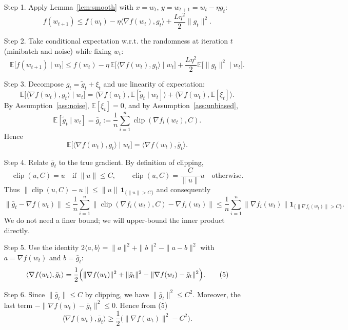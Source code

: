 \documentclass{article}
\newcommand{\E}{\mathbb{E}}
\begin{document}
\begin{enumerate}
\item[Step 1.] Apply Lemma~\ref{lem:smooth} with $x=w_t$, $y=w_{t+1}=w_t-\eta g_t$:
\[
f(w_{t+1})\le f(w_t)-\eta\langle\nabla f(w_t),g_t\rangle+\frac{L\eta^{2}}{2}\|g_t\|^{2}.
\tag{2}
\]

\item[Step 2.] Take conditional expectation w.r.t. the randomness at iteration $t$ (minibatch and noise) while fixing $w_t$:
\[
\E\!\bigl[f(w_{t+1})\mid w_t\bigr]\le f(w_t)-\eta\,\E\!\bigl[\langle\nabla f(w_t),g_t\rangle\mid w_t\bigr]
+\frac{L\eta^{2}}{2}\E\!\bigl[\|g_t\|^{2}\mid w_t\bigr].
\tag{3}
\]

\item[Step 3.] Decompose $g_t=\tilde g_t+\xi_t$ and use linearity of expectation:
\[
\E\!\bigl[\langle\nabla f(w_t),g_t\rangle\mid w_t\bigr]
=\langle\nabla f(w_t),\E[\tilde g_t\mid w_t]\rangle
+\langle\nabla f(w_t),\E[\xi_t]\rangle.
\]
By Assumption~\ref{ass:noise}, $\E[\xi_t]=0$, and by Assumption~\ref{ass:unbiased},
\[
\E[\tilde g_t\mid w_t]=\bar g_t:=\frac{1}{n}\sum_{i=1}^{n}\operatorname{clip}(\nabla f_i(w_t),C).
\]
Hence
\[
\E\!\bigl[\langle\nabla f(w_t),g_t\rangle\mid w_t\bigr]
=\langle\nabla f(w_t),\bar g_t\rangle.
\tag{4}
\]

\item[Step 4.] Relate $\bar g_t$ to the true gradient. By definition of clipping,
\[
\operatorname{clip}(u,C)=u\quad\text{if }\|u\|\le C,\qquad
\operatorname{clip}(u,C)=\frac{C}{\|u\|}u\quad\text{otherwise}.
\]
Thus $\|\operatorname{clip}(u,C)-u\|\le \|u\|\,\mathbf 1_{\{\|u\|>C\}}$ and consequently
\[
\bigl\|\bar g_t-\nabla f(w_t)\bigr\|
\le\frac{1}{n}\sum_{i=1}^{n}\bigl\|\operatorname{clip}(\nabla f_i(w_t),C)-\nabla f_i(w_t)\bigr\|
\le\frac{1}{n}\sum_{i=1}^{n}\|\nabla f_i(w_t)\|\mathbf 1_{\{\|\nabla f_i(w_t)\|>C\}}.
\]
We do not need a finer bound; we will upper‑bound the inner product directly.

\item[Step 5.] Use the identity $2\langle a,b\rangle=\|a\|^{2}+\|b\|^{2}-\|a-b\|^{2}$ with $a=\nabla f(w_t)$ and $b=\bar g_t$:
\[
\langle\nabla f(w_t),\bar g_t\rangle
=\frac{1}{2}\Bigl(\|\nabla f(w_t)\|^{2}+\|\bar g_t\|^{2}-\|\nabla f(w_t)-\bar g_t\|^{2}\Bigr).
\tag{5}
\]

\item[Step 6.] Since $\|\bar g_t\|\le C$ by clipping, we have $\|\bar g_t\|^{2}\le C^{2}$. Moreover, the last term $-\|\nabla f(w_t)-\bar g_t\|^{2}\le 0$. Hence from (5)
\[
\langle\nabla f(w_t),\bar g_t\rangle
\ge\frac{1}{2}\bigl(\|\nabla f(w_t)\|^{2}-C^{2}\bigr).
\tag{6}
\]


\end{enumerate}
\end{document}
